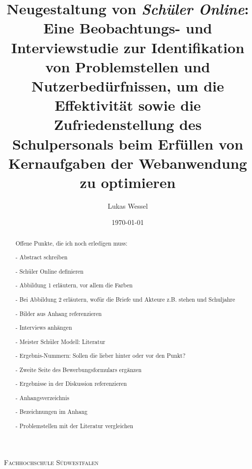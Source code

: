 \documentclass[pdftex,a4paper,abstracton,11pt,parskip=half,bibtotocnumbered]{scrartcl}
\title{Neugestaltung von \textit{Schüler Online}: Eine Beobachtungs- und Interviewstudie zur Identifikation von Problemstellen und Nutzerbedürfnissen, um die Effektivität sowie die Zufriedenstellung des Schulpersonals beim Erfüllen von Kernaufgaben der Webanwendung zu optimieren}
\author{Lukas Wessel}
\date{\today}
\begin{document}

\makeatletter
\begin{titlepage}
	\centering
	{\scshape\LARGE Fachhochschule Südwestfalen \par}
	\vspace{1cm}
	\vspace{1.5cm}
	{\huge\bfseries \@title\par}
	\vspace{3cm}
	{\Large \@author\par}
	\vspace{1cm}
	{\Large \@date\par}
	\vfill

	\raggedright
\end{titlepage}
\makeatother

\thispagestyle{empty}
\begin{abstract}
Offene Punkte, die ich noch erledigen muss:

- Abstract schreiben

- Schüler Online definieren

- Abbildung 1 erläutern, vor allem die Farben

- Bei Abbildung 2 erläutern, wofür die Briefe und Akteure z.B. stehen und Schuljahre 


- Bilder aus Anhang referenzieren

- Interviews anhängen

- Meister Schüler Modell: Literatur

- Ergebnis-Nummern: Sollen die lieber hinter oder vor den Punkt?

- Zweite Seite des Bewerbungsformulars ergänzen

- Ergebnisse in der Diskussion referenzieren

- Anhangsverzeichnis

- Bezeichnungen im Anhang

- Problemstellen mit der Literatur vergleichen


\end{abstract}

\vfill
\tableofcontents
\pagebreak

\pagebreak

\setcounter{page}{1}








%

\printbibliography
\end{document}
